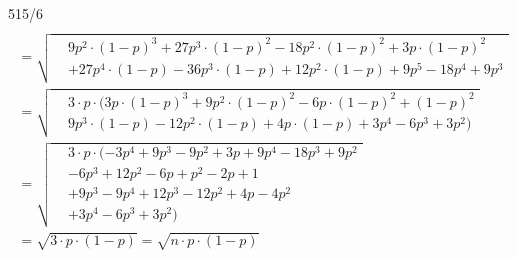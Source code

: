 \begin{exercise}{515/6}
\begin{gather*}
{    } \\
    \;= \sqrt{
      \begin{aligned}
        &9p^2 \cdot (1 - p)^3 + 27p^3 \cdot (1 - p)^2 - 18p^2 \cdot (1 - p)^2 + 3p \cdot (1 - p)^2 \\
        &+ 27p^4 \cdot (1 - p) - 36p^3 \cdot (1 - p) + 12p^2 \cdot (1 - p) + 9p^5 - 18p^4 + 9p^3
      \end{aligned}
    } \\
    \;= \sqrt{
      \begin{aligned}
        &3 \cdot p \cdot (3p \cdot (1 - p)^3 + 9p^2 \cdot (1 - p)^2 - 6p \cdot (1 - p)^2 + (1 - p)^2 \\
        &9p^3 \cdot (1 - p) - 12p^2 \cdot (1 - p) + 4p \cdot (1 - p) + 3p^4 - 6p^3 + 3p^2)
      \end{aligned}
    } \\
    \;= \sqrt{
      \begin{aligned}
        &3 \cdot p \cdot (-3p^4 + 9p^3 - 9p^2 + 3p + 9p^4 - 18p^3 + 9p^2 \\
        &- 6p^3 + 12p^2 - 6p + p^2 - 2p + 1 \\
        &+ 9p^3 - 9p^4 + 12p^3 - 12p^2 + 4p - 4p^2 \\
        &+ 3p^4 - 6p^3 + 3p^2)
      \end{aligned}
    } \\
    \;= \sqrt{3 \cdot p \cdot (1 - p)} = \sqrt{n \cdot p \cdot (1 - p)}
  \end{gather*}
\end{exercise}
